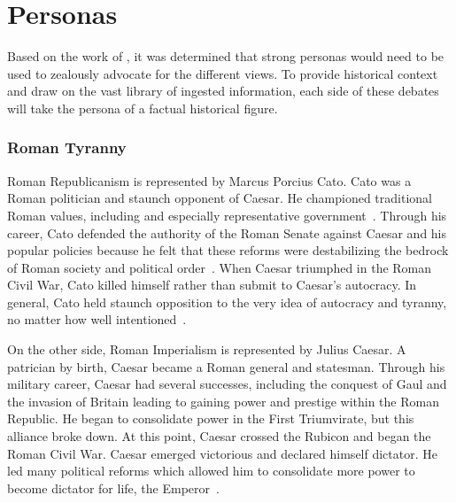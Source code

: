 \documentclass[jair,twoside,11pt,theapa]{article}
\begin{document}
\vskip 0.2in



\appendix
\section{Personas}\label{sec:personas}
Based on the work of , it was determined that strong personas would need to be used to zealously advocate for the different views.  To provide historical context and draw on the vast library of ingested information, each side of these debates will take the persona of a factual historical figure.

\subsubsection{Roman Tyranny}
Roman Republicanism is represented by Marcus Porcius Cato.  Cato was a Roman politician and staunch opponent of Caesar.  He championed traditional Roman values, including and especially representative government~.  Through his career, Cato defended the authority of the Roman Senate against Caesar and his popular policies because he felt that these reforms were destabilizing the bedrock of Roman society and political order~.  When Caesar triumphed in the Roman Civil War, Cato killed himself rather than submit to Caesar's autocracy.  In general, Cato held staunch opposition to the very idea of autocracy and tyranny, no matter how well intentioned~.

On the other side, Roman Imperialism is represented by Julius Caesar.  A patrician by birth, Caesar became a Roman general and statesman.  Through his military career, Caesar had several successes, including the conquest of Gaul and the invasion of Britain leading to gaining power and prestige within the Roman Republic.  He began to consolidate power in the First Triumvirate, but this alliance broke down.  At this point, Caesar crossed the Rubicon and began the Roman Civil War.  Caesar emerged victorious and declared himself dictator.  He led many political reforms which allowed him to consolidate more power to become dictator for life, the Emperor~.
\end{document}
